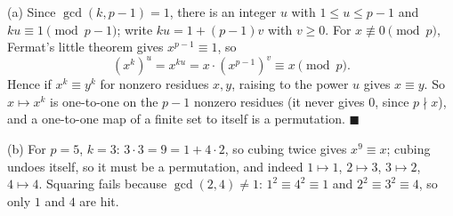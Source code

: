 (a) Since $\gcd(k,p-1)=1$, there is an integer $u$ with $1\le u\le p-1$ and $ku\equiv1\pmod{p-1}$; write $ku=1+(p-1)v$ with $v\ge0$. For $x\not\equiv0\pmod p$, Fermat's little theorem gives $x^{p-1}\equiv1$, so
\[
(x^k)^u=x^{ku}=x\cdot(x^{p-1})^v\equiv x\pmod p .
\]
Hence if $x^k\equiv y^k$ for nonzero residues $x,y$, raising to the power $u$ gives $x\equiv y$. So $x\mapsto x^k$ is one-to-one on the $p-1$ nonzero residues (it never gives $0$, since $p\nmid x$), and a one-to-one map of a finite set to itself is a permutation. $\blacksquare$

(b) For $p=5$, $k=3$: $3\cdot3=9=1+4\cdot2$, so cubing twice gives $x^9\equiv x$; cubing undoes itself, so it must be a permutation, and indeed $1\mapsto1$, $2\mapsto3$, $3\mapsto2$, $4\mapsto4$. Squaring fails because $\gcd(2,4)\ne1$: $1^2\equiv4^2\equiv1$ and $2^2\equiv3^2\equiv4$, so only $1$ and $4$ are hit.
